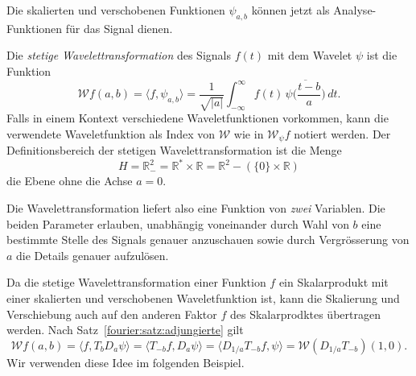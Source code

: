 
Die skalierten und verschobenen Funktionen $\psi_{a,b}$ können jetzt als
Analyse-Funktionen für das Signal dienen.

\begin{definition}
\label{cwt:definition}
Die {\em stetige Wavelettransformation} des Signals $f(t)$ mit dem Wavelet
%
%
$\psi$ ist die Funktion
\begin{equation}
\mathcal{W}f (a,b)
=
\langle f,\psi_{a,b}\rangle
=
\frac{1}{\sqrt{|a|}}\int_{-\infty}^\infty f(t)\,\overline{
\psi\biggl(\frac{t-b}{a}\biggr)}\,dt.
\label{cwt:definition:eq}
\end{equation}
Falls in einem Kontext verschiedene Waveletfunktionen vorkommen, kann 
die verwendete Waveletfunktion als Index von $\mathcal{W}$ wie in
$\mathcal{W}_{\psi}f$ notiert werden.
Der Definitionsbereich der stetigen Wavelettransformation ist die Menge
\[
H
=
\mathbb R^2_-
=
\mathbb R^*\times \mathbb R
=
\mathbb R^2 - (\{0\}\times \mathbb R)
\]
die Ebene ohne die Achse $a=0$.
\end{definition}

Die Wavelettransformation liefert also eine Funktion von {\em zwei}
Variablen.
Die beiden Parameter erlauben, unabhängig voneinander
durch Wahl von $b$ eine bestimmte Stelle des Signals genauer anzuschauen
sowie durch Vergrösserung von $a$ die Details genauer aufzulösen.

Da die stetige Wavelettransformation einer Funktion $f$ ein Skalarprodukt
mit einer skalierten und verschobenen Waveletfunktion ist, kann die Skalierung
und Verschiebung auch auf den anderen Faktor $f$ des Skalarprodktes
übertragen werden.
Nach Satz~\ref{fourier:satz:adjungierte} gilt
\begin{equation}
\mathcal{W}f(a,b)
=
\langle f,T_bD_a\psi\rangle
=
\langle T_{-b}f,D_a\psi\rangle
=
\langle D_{1/a}T_{-b}f,\psi\rangle
=
\mathcal{W}(D_{1/a}T_{-b})(1,0).
\label{cwt:formel:shift}
\end{equation}
Wir verwenden diese Idee im folgenden Beispiel.


